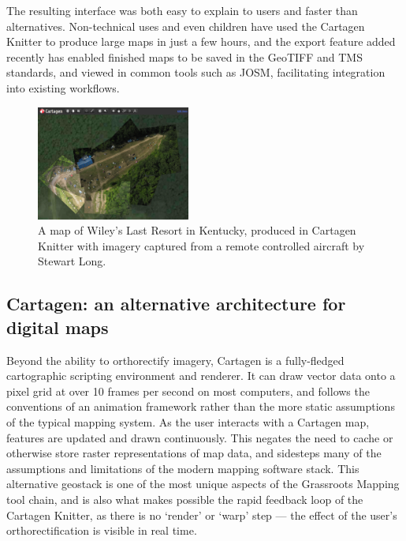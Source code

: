 \documentclass[11pt,oneside,notitlepage]{report}
\begin{document}
{{The resulting interface was both easy to explain to users and faster than alternatives. Non-technical uses and even children have used the Cartagen Knitter to produce large maps in just a few hours, and the export feature added recently has enabled finished maps to be saved in the \ac{GeoTIFF} and \ac{TMS} standards, and viewed in common tools such as \ac{JOSM}, facilitating integration into existing workflows. 

\begin{figure}
	\begin{flushright}
		\includegraphics[width=0.45\textwidth]{images/knitter-wileys.png}
		\caption{A map of Wiley's Last Resort in Kentucky, produced in Cartagen Knitter with imagery captured from a remote controlled aircraft by Stewart Long.}
	\end{flushright}
\end{figure}

\subsection{Cartagen: an alternative architecture for digital maps}

Beyond the ability to orthorectify imagery, Cartagen is a fully-fledged cartographic scripting environment and renderer. It can draw vector data onto a pixel grid at over 10 frames per second on most computers, and follows the conventions of an animation framework rather than the more static assumptions of the typical mapping system. As the user interacts with a Cartagen map, features are updated and drawn continuously. This negates the need to cache or otherwise store raster representations of map data, and sidesteps many of the assumptions and limitations of the modern mapping software stack. This alternative geostack is one of the most unique aspects of the Grassroots Mapping tool chain, and is also what makes possible the rapid feedback loop of the Cartagen Knitter, as there is no `render' or `warp' step --- the effect of the user's orthorectification is visible in real time. 

}}
\end{document}
